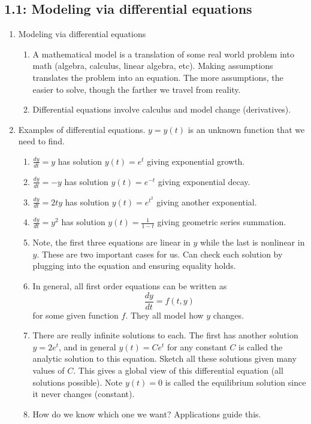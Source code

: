 \documentclass{article}
\newcommand{\ds}{\displaystyle}
\begin{document}
\subsection{1.1: Modeling via differential equations}
\begin{enumerate}

\item Modeling via differential equations
\begin{enumerate}
\item A mathematical model is a translation of some real world problem into math (algebra, calculus, linear algebra, etc). Making assumptions translates the problem into an equation. The more assumptions, the easier to solve, though the farther we travel from reality.
\item Differential equations involve calculus and model change (derivatives).
\end{enumerate}


\item Examples of differential equations. $y=y(t)$ is an unknown function that we need to find.
\begin{enumerate}
\item $\ds \frac{dy}{dt} = y$ has solution $y(t)=e^t$ giving exponential growth.
\item $\ds \frac{dy}{dt} = -y$ has solution $y(t)=e^{-t}$ giving exponential decay.
\item $\ds \frac{dy}{dt} = 2ty$ has solution $y(t)=e^{t^2}$ giving another exponential.
\item $\ds \frac{dy}{dt} = y^2$ has solution $y(t)=\frac{1}{1-t}$ giving geometric series summation.
\item Note, the first three equations are linear in $y$ while the last is nonlinear in $y$. These are two important cases for us. Can check each solution by plugging into the equation and ensuring equality holds.
\item In general, all first order equations can be written as
\[
\frac{dy}{dt} = f(t,y)
\]
for some given function $f$. They all model how $y$ changes.
\item There are really infinite solutions to each. The first has another solution $y=2e^t$, and in general $y(t)=Ce^t$ for any constant $C$ is called the analytic solution to this equation. Sketch all these solutions given many values of $C$. This gives a global view of this differential equation (all solutions possible). Note $y(t)=0$ is called the equilibrium solution since it never changes (constant). 
\item How do we know which one we want? Applications guide this.
\end{enumerate}


\end{enumerate}
\end{document}
